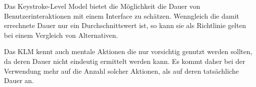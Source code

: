 \documentclass[a4paper,10pt]{scrartcl}
\begin{document}
\kopf
\renewcommand{\figurename}{Figure}


Das Keystroke-Level Model bietet die Möglichkeit die Dauer von Benutzerinteraktionen mit einem Interface zu schätzen. Wenngleich die damit errechnete Dauer nur ein Durchschnittswert ist, so kann sie als Richtlinie gelten bei einem Vergleich von Alternativen.

Das KLM kennt auch mentale Aktionen die nur vorsichtig genutzt werden sollten, da deren Dauer nicht eindeutig ermittelt werden kann. Es kommt daher bei der Verwendung mehr auf die Anzahl solcher Aktionen, als auf deren tatsächliche Dauer an.
\end{document}
